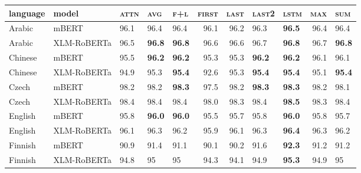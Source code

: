 \begin{tabular}{lllllrrllrl}
\toprule
\textbf{language} & \textbf{model} & \textsc{attn} & \textsc{avg} & \textsc{f+l} &  \textsc{first} &  \textsc{last} & \textsc{last2} & \textsc{lstm} &  \textsc{max} & \textsc{sum} \\
\midrule
           Arabic &          mBERT &          96.1 &         96.4 &         96.4 &            96.1 &           96.2 &           96.3 &    \textbf{96.5} &          96.4 &         96.4 \\
           Arabic &    XLM-RoBERTa &          96.5 &   \textbf{96.8} &   \textbf{96.8} &            96.6 &           96.6 &           96.7 &    \textbf{96.8} &          96.7 &   \textbf{96.8} \\
          Chinese &          mBERT &          95.5 &   \textbf{96.2} &   \textbf{96.2} &            95.3 &           95.3 &     \textbf{96.2} &    \textbf{96.2} &          96.1 &         96.1 \\
          Chinese &    XLM-RoBERTa &          94.9 &         95.3 &   \textbf{95.4} &            92.6 &           95.3 &     \textbf{95.4} &    \textbf{95.4} &          95.1 &   \textbf{95.4} \\
            Czech &          mBERT &          98.2 &         98.2 &   \textbf{98.3} &            97.5 &           98.2 &     \textbf{98.3} &    \textbf{98.3} &          98.2 &         98.1 \\
            Czech &    XLM-RoBERTa &          98.4 &         98.4 &         98.4 &            98.0 &           98.3 &           98.4 &    \textbf{98.5} &          98.3 &         98.4 \\
          English &          mBERT &          95.8 &   \textbf{96.0} &   \textbf{96.0} &            95.5 &           95.7 &           95.8 &    \textbf{96.0} &          95.8 &         95.7 \\
          English &    XLM-RoBERTa &          96.1 &         96.3 &         96.2 &            95.9 &           96.1 &           96.3 &    \textbf{96.4} &          96.3 &         96.2 \\
          Finnish &          mBERT &          90.9 &         91.4 &         91.1 &            90.1 &           90.2 &           91.6 &    \textbf{92.3} &          91.2 &         91.2 \\
          Finnish &    XLM-RoBERTa &          94.8 &           95 &           95 &            94.3 &           94.1 &           94.9 &    \textbf{95.3} &          94.9 &           95 \\

\end{tabular}
